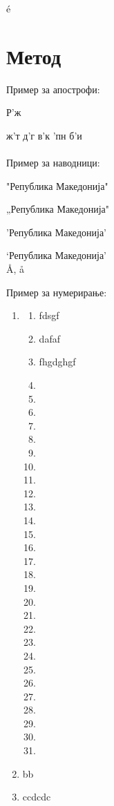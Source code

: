 \documentclass[a4paper]{report}
\begin{document}
 

 é
 
\section{Метод}
Пример за апострофи:

 Р'ж
 
 ж'т д'г в'к 'пн б'и\\\\
 
 Пример за наводници:

"Република Македонија"

„Република Македонија"

'Република Македонија'

`Република Македонија'\\

\AA, \aa


 Пример за нумерирање:
 \begin{enumerate}%
 \item \begin{enumerate}
 \item fdsgf
 \item dafaf
 \item fhgdghgf
 \item
  \item
   \item
   \item
   \item
   \item
   \item
   \item
   \item
   \item
   \item
   \item
   \item
   \item
   \item
   \item
   \item
   \item
   \item
   \item
   \item
   \item
   \item	
   \item
   \item
   \item
   \item
   \item
 \end{enumerate}
 \item bb
 \item ccdcdc
 \end{enumerate}
 
\end{document}
